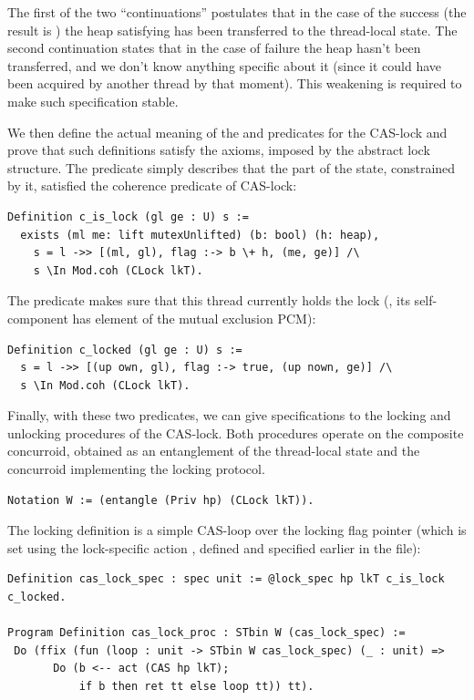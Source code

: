 The first of the two ``continuations'' postulates that in the case of
the success (the result is ) the heap  satisfying
 has been transferred to the thread-local
state. The second continuation states that in the case of failure the
heap hasn't been transferred, and we don't know anything specific
about it (since it could have been acquired by another thread by that
moment). This weakening is required to make such specification stable.

We then define the actual meaning of the  and
 predicates for the CAS-lock and prove that such
definitions satisfy the axioms, imposed by the abstract lock
structure. The  predicate simply describes that the
part of the state, constrained by it, satisfied the coherence
predicate of CAS-lock:

\begin{lstlisting}
Definition c_is_lock (gl ge : U) s := 
  exists (ml me: lift mutexUnlifted) (b: bool) (h: heap),
    s = l ->> [(ml, gl), flag :-> b \+ h, (me, ge)] /\
    s \In Mod.coh (CLock lkT).  
\end{lstlisting}

The  predicate makes sure that this thread currently
holds the lock (\ie, its self-component has \code{(up own)} element of
the mutual exclusion PCM):

\begin{lstlisting}
Definition c_locked (gl ge : U) s :=
  s = l ->> [(up own, gl), flag :-> true, (up nown, ge)] /\
  s \In Mod.coh (CLock lkT).  
\end{lstlisting}

Finally, with these two predicates, we can give specifications to the
locking and unlocking procedures of the CAS-lock. Both procedures
operate on the composite concurroid, obtained as an entanglement of
the thread-local state and the concurroid implementing the locking
protocol.

\begin{lstlisting}
Notation W := (entangle (Priv hp) (CLock lkT)).   
\end{lstlisting}

The locking definition is a simple CAS-loop over the locking flag
pointer (which is set using the lock-specific action ,
defined and specified earlier in the file):

\begin{lstlisting}
Definition cas_lock_spec : spec unit := @lock_spec hp lkT c_is_lock c_locked.

Program Definition cas_lock_proc : STbin W (cas_lock_spec) :=
 Do (ffix (fun (loop : unit -> STbin W cas_lock_spec) (_ : unit) =>
       Do (b <-- act (CAS hp lkT);
           if b then ret tt else loop tt)) tt).
\end{lstlisting}

